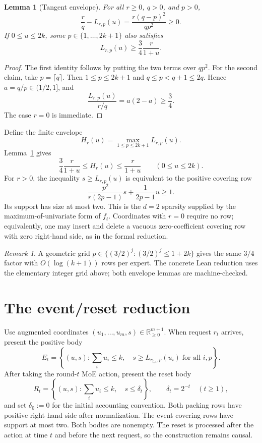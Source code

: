 \documentclass[11pt]{article}
\newtheorem{lemma}[theorem]{Lemma}
\theoremstyle{remark}
\newtheorem{remark}[theorem]{Remark}
\newcommand{\R}{\mathbb R}
\begin{document}
\begin{lemma}[Tangent envelope]\label{lem:tangent}
For all $r\geq0$, $q>0$, and $p>0$,
\[
 \frac rq-L_{r,p}(u)=\frac{r(q-p)^2}{qp^2}\geq0.
\]
If $0\leq u\leq2k$, some $p\in\{1,\ldots,2k+1\}$ also satisfies
\[
 L_{r,p}(u)\geq\frac34\frac r{1+u}.
\]
\end{lemma}

\begin{proof}
The first identity follows by putting the two terms over $qp^2$.  For the
second claim, take $p=\lceil q\rceil$.  Then $1\leq p\leq2k+1$ and
$q\leq p<q+1\leq2q$.  Hence $a=q/p\in(1/2,1]$, and
\[
 \frac{L_{r,p}(u)}{r/q}=a(2-a)\geq\frac34.
\]
The case $r=0$ is immediate.
\end{proof}

Define the finite envelope
\[
 H_r(u)=\max_{1\leq p\leq2k+1}L_{r,p}(u).
\]
Lemma~\ref{lem:tangent} gives
\begin{equation}\label{eq:envelope}
 \frac34\frac r{1+u}\leq H_r(u)\leq\frac r{1+u}
 \qquad(0\leq u\leq2k).
\end{equation}
For $r>0$, the inequality $s\geq L_{r,p}(u)$ is equivalent to the positive
covering row
\begin{equation}\label{eq:cover-row}
 \frac{p^2}{r(2p-1)}s+\frac1{2p-1}u\geq1.
\end{equation}
Its support has size at most two.  This is the $d=2$ sparsity supplied by the
maximum-of-univariate form of $f_t$.  Coordinates with $r=0$ require no row;
equivalently, one may insert and delete a vacuous zero-coefficient covering row
with zero right-hand side, as in the formal reduction.

\begin{remark}
A geometric grid $p\in\{(3/2)^j:(3/2)^j\leq1+2k\}$ gives the same $3/4$
factor with $O(\log(k+1))$ rows per expert.  The concrete Lean reduction uses
the elementary integer grid above; both envelope lemmas are machine-checked.
\end{remark}

\section{The event/reset reduction}

Use augmented coordinates $(u_1,\ldots,u_m,s)\in\R_{\geq0}^{m+1}$.  When
request $r_t$ arrives, present the positive body
\begin{equation}\label{eq:event}
 E_t=\left\{(u,s):\sum_i u_i\leq k,\quad
 s\geq L_{r_{t,i},p}(u_i)\;\text{for all }i,p\right\}.
\end{equation}
After taking the round-$t$ MoE action, present the reset body
\begin{equation}\label{eq:reset}
 R_t=\left\{(u,s):\sum_i u_i\leq k,\quad s\leq\delta_t\right\},
 \qquad \delta_t=2^{-t}\quad(t\geq1),
\end{equation}
and set $\delta_0:=0$ for the initial accounting convention.
Both packing rows have positive right-hand side after normalization.  The event
covering rows have support at most two.  Both bodies are nonempty.  The reset is
processed after the action at time $t$ and before the next request, so the
construction remains causal.
\end{document}
